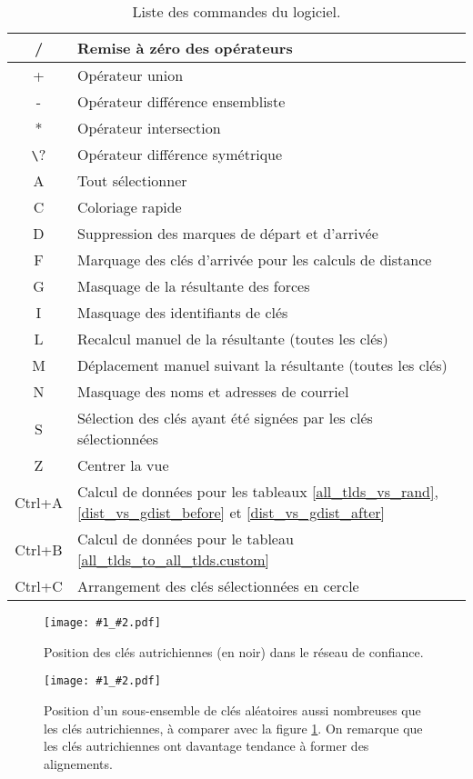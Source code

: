 \documentclass[a4paper]{article}
\newcommand{\img}[3]{
\begin{figure}
\centering
\texttt{[image: \#1\_\#2.pdf]}
\caption{#3}
\label{img_#2}
\end{figure}
}
\begin{document}
\begin{table}[p]
\begin{tabular}{|c|l|}
\hline / & Remise à zéro des opérateurs \\
\hline + & Opérateur union \\
\hline - & Opérateur différence ensembliste \\
\hline * & Opérateur intersection \\
\hline \verb?\? & Opérateur différence symétrique \\
\hline A & Tout sélectionner \\
\hline C & Coloriage rapide \\
\hline D & Suppression des marques de départ et d'arrivée \\
\hline F & Marquage des clés d'arrivée pour les calculs de distance \\
\hline G & Masquage de la résultante des forces \\
\hline I & Masquage des identifiants de clés \\
\hline L & Recalcul manuel de la résultante (toutes les clés) \\
\hline M & Déplacement manuel suivant la résultante (toutes les clés) \\
\hline N & Masquage des noms et adresses de courriel \\
\hline S & Sélection des clés ayant été signées par les clés sélectionnées \\
\hline Z & Centrer la vue \\
\hline Ctrl+A & Calcul de données pour les tableaux \ref{all_tlds_vs_rand}, \ref{dist_vs_gdist_before} et \ref{dist_vs_gdist_after} \\
\hline Ctrl+B & Calcul de données pour le tableau \ref{all_tlds_to_all_tlds.custom} \\
\hline Ctrl+C & Arrangement des clés sélectionnées en cercle \\
\hline
\end{tabular}
\caption{Liste des commandes du logiciel.}
\label{commands}
\end{table}


\img{images/r2002}{at}{Position des clés autrichiennes (en noir) dans le réseau de confiance.}

\img{images/r2002}{rnd_at}{Position d'un sous-ensemble de clés aléatoires aussi nombreuses que les clés autrichiennes, à comparer avec la figure \ref{img_at}. On remarque que les clés autrichiennes ont davantage tendance à former des alignements.}

\end{document}
